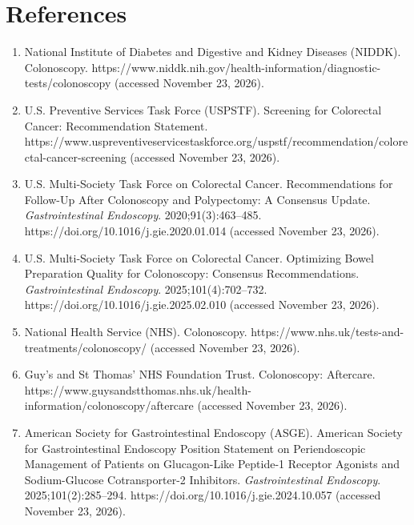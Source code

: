 \section*{References}
\begin{enumerate}
  \item National Institute of Diabetes and Digestive and Kidney Diseases (NIDDK). Colonoscopy. https://www.niddk.nih.gov/health-information/diagnostic-tests/colonoscopy (accessed November 23, 2026).
  \item U.S. Preventive Services Task Force (USPSTF). Screening for Colorectal Cancer: Recommendation Statement. https://www.uspreventiveservicestaskforce.org/uspstf/recommendation/colorectal-cancer-screening (accessed November 23, 2026).
  \item U.S. Multi-Society Task Force on Colorectal Cancer. Recommendations for Follow-Up After Colonoscopy and Polypectomy: A Consensus Update. \textit{Gastrointestinal Endoscopy}. 2020;91(3):463--485. https://doi.org/10.1016/j.gie.2020.01.014 (accessed November 23, 2026).
  \item U.S. Multi-Society Task Force on Colorectal Cancer. Optimizing Bowel Preparation Quality for Colonoscopy: Consensus Recommendations. \textit{Gastrointestinal Endoscopy}. 2025;101(4):702--732. https://doi.org/10.1016/j.gie.2025.02.010 (accessed November 23, 2026).
  \item National Health Service (NHS). Colonoscopy. https://www.nhs.uk/tests-and-treatments/colonoscopy/ (accessed November 23, 2026).
  \item Guy's and St Thomas' NHS Foundation Trust. Colonoscopy: Aftercare. https://www.guysandstthomas.nhs.uk/health-information/colonoscopy/aftercare (accessed November 23, 2026).
  \item American Society for Gastrointestinal Endoscopy (ASGE). American Society for Gastrointestinal Endoscopy Position Statement on Periendoscopic Management of Patients on Glucagon-Like Peptide-1 Receptor Agonists and Sodium-Glucose Cotransporter-2 Inhibitors. \textit{Gastrointestinal Endoscopy}. 2025;101(2):285--294. https://doi.org/10.1016/j.gie.2024.10.057 (accessed November 23, 2026).
\end{enumerate}
\clearpage
